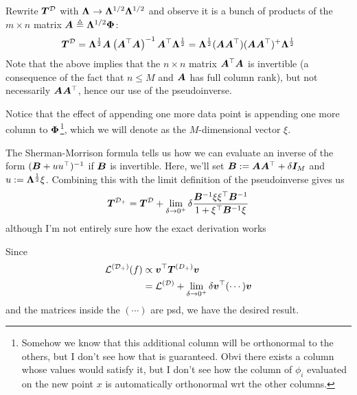 \documentclass[11pt]{article}
\renewcommand\vec[2][]{\bm{#2}_{#1}}
\newcommand\mc{\mathcal}
\begin{document}
\begin{example}
	\begin{compactenum}
		\item Rewrite $\matr{T}^{\mc D}$ with $\matr{\Lambda} \rightarrow \matr{\Lambda}^{1/2} \matr{\Lambda}^{1/2}$ and observe it is a bunch of products of the $m \times n$ matrix $\matr A \triangleq \matr\Lambda^{1/2} \matr\Phi$:
		$$
		\matr{T}^{\mc D} 
			= \matr{\Lambda}^{\onehalf} \matr A \lr{\matr A^\top \matr A}^{-1} \matr A^\top \matr{\Lambda}^{\onehalf}
			= \matr{\Lambda}^{\onehalf} (\matr A \matr A^\top) (\matr A \matr A^\top)^{+}  \matr{\Lambda}^{\onehalf}
		$$
		Note that the above implies that the $n \times n$ matrix $\matr A^\top \matr A$ is invertible (a consequence of the fact that $n \leq M$ and $\matr A$ has full column rank), but not necessarily $\matr A \matr A^\top$, hence our use of the pseudoinverse. 
		
		\item Notice that the effect of appending one more data point is appending one more column to $\matr \Phi$\footnote{Somehow we know that this additional column will be orthonormal to the others, but I don't see how that is guaranteed. Obvi there exists a column whose values would satisfy it, but I don't see how the column of $\phi_i$ evaluated on the new point $x$ is automatically orthonormal wrt the other columns.}, which we will denote as the $M$-dimensional vector $\xi$. 
		
		\item The Sherman-Morrison formula tells us how we can evaluate an inverse of the form $(\matr B + u u^\top)^{-1}$ if $\matr B$ is invertible. Here, we'll set $\matr B := \matr A \matr A^\top + \delta \matr[M]{I}$ and $u := \matr{\Lambda}^{\onehalf} \xi$. Combining this with the limit definition of the pseudoinverse gives us 
		$$
		\matr{T}^{\mc D_+}
			= \matr{T}^{\mc D}
				+ \lim_{\delta \to 0^+} \delta \frac{ 
					\minv{B} \xi \xi^\top \minv{B}
				}{
			1 + \xi^\top \minv{B} \xi}
		$$ 	\textellipsis although I'm not entirely sure how the exact derivation works\textellipsis 
		
		\item Since 
		\begin{align}
			\mc L^{(\mc D_+)}(f) 
				&\propto \vec v^\top \matr{T}^{(D_+)} \vec v \\
				&= \mc{L}^{(\mc D)} + \lim_{\delta \to 0^+} \delta \vec v^\top (\cdots) \vec v
		\end{align}
		and the matrices inside the $(\cdots)$ are psd, we have the desired result. 
	\end{compactenum}


\end{example}
\end{document}
